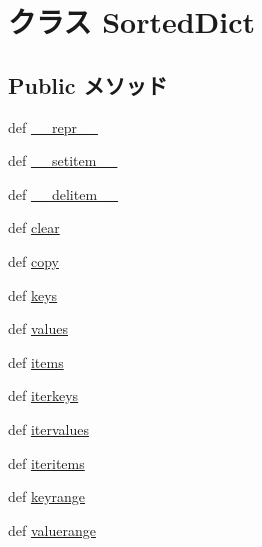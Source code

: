 \hypertarget{classm5_1_1util_1_1sorteddict_1_1SortedDict}{
\section{クラス SortedDict}
\label{classm5_1_1util_1_1sorteddict_1_1SortedDict}
}
\subsection*{Public メソッド}
\begin{DoxyCompactItemize}
\item 
def \hyperlink{classm5_1_1util_1_1sorteddict_1_1SortedDict_ad8b9328939df072e4740cd9a63189744}{\_\-\_\-repr\_\-\_\-}
\item 
def \hyperlink{classm5_1_1util_1_1sorteddict_1_1SortedDict_a09195b01147e970ca71c48b57f653940}{\_\-\_\-setitem\_\-\_\-}
\item 
def \hyperlink{classm5_1_1util_1_1sorteddict_1_1SortedDict_a5fa6cfe34d7e2fe5b9c38e1d74fffac8}{\_\-\_\-delitem\_\-\_\-}
\item 
def \hyperlink{classm5_1_1util_1_1sorteddict_1_1SortedDict_a07b95aa63e9e2d286ef0aa83d5bb34b2}{clear}
\item 
def \hyperlink{classm5_1_1util_1_1sorteddict_1_1SortedDict_a2fa43c22b5f7af93ba8b4a56871f006a}{copy}
\item 
def \hyperlink{classm5_1_1util_1_1sorteddict_1_1SortedDict_aeb7ba70a3c91eced4f8d49ac5dc0c398}{keys}
\item 
def \hyperlink{classm5_1_1util_1_1sorteddict_1_1SortedDict_abb73a0060caeba53780d972f37623f1e}{values}
\item 
def \hyperlink{classm5_1_1util_1_1sorteddict_1_1SortedDict_a717291221885735d6870d7179083ec07}{items}
\item 
def \hyperlink{classm5_1_1util_1_1sorteddict_1_1SortedDict_a44560b0b40dfcd2069b980760783cc7b}{iterkeys}
\item 
def \hyperlink{classm5_1_1util_1_1sorteddict_1_1SortedDict_aeb6e8630a10560ad0d4b34377c790f19}{itervalues}
\item 
def \hyperlink{classm5_1_1util_1_1sorteddict_1_1SortedDict_a13d39839ad1cfd4c47f524735933c0bf}{iteritems}
\item 
def \hyperlink{classm5_1_1util_1_1sorteddict_1_1SortedDict_a6a19cd13e968887bb9941ec83b4430f3}{keyrange}
\item 
def \hyperlink{classm5_1_1util_1_1sorteddict_1_1SortedDict_a25c1d568ae966d7cb5662748006c02a7}{valuerange}

\end{DoxyCompactItemize}
